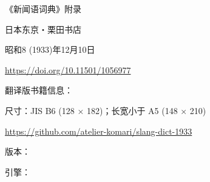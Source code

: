 
\maketitle

\clearpage


《新闻语词典》附录

日本东京・栗田书店

昭和8 (1933)年12月10日

\url{https://doi.org/10.11501/1056977}

\vspace*{\fill}

翻译版书籍信息：

尺寸：JIS B6 (128 × 182)；长宽小于 A5 (148 × 210)

\url{https://github.com/atelier-komari/slang-dict-1933}

版本：\gitversion

引擎：\luatexbanner

\clearpage
